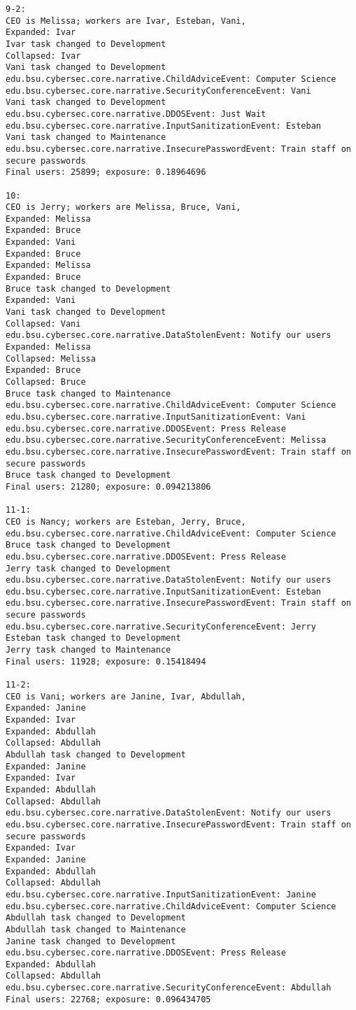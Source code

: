 \begin{verbatim}
9-2:
CEO is Melissa; workers are Ivar, Esteban, Vani, 
Expanded: Ivar
Ivar task changed to Development
Collapsed: Ivar
Vani task changed to Development
edu.bsu.cybersec.core.narrative.ChildAdviceEvent: Computer Science
edu.bsu.cybersec.core.narrative.SecurityConferenceEvent: Vani
Vani task changed to Development
edu.bsu.cybersec.core.narrative.DDOSEvent: Just Wait
edu.bsu.cybersec.core.narrative.InputSanitizationEvent: Esteban
Vani task changed to Maintenance
edu.bsu.cybersec.core.narrative.InsecurePasswordEvent: Train staff on secure passwords
Final users: 25899; exposure: 0.18964696

10:
CEO is Jerry; workers are Melissa, Bruce, Vani, 
Expanded: Melissa
Expanded: Bruce
Expanded: Vani
Expanded: Bruce
Expanded: Melissa
Expanded: Bruce
Bruce task changed to Development
Expanded: Vani
Vani task changed to Development
Collapsed: Vani
edu.bsu.cybersec.core.narrative.DataStolenEvent: Notify our users
Expanded: Melissa
Collapsed: Melissa
Expanded: Bruce
Collapsed: Bruce
Bruce task changed to Maintenance
edu.bsu.cybersec.core.narrative.ChildAdviceEvent: Computer Science
edu.bsu.cybersec.core.narrative.InputSanitizationEvent: Vani
edu.bsu.cybersec.core.narrative.DDOSEvent: Press Release
edu.bsu.cybersec.core.narrative.SecurityConferenceEvent: Melissa
edu.bsu.cybersec.core.narrative.InsecurePasswordEvent: Train staff on secure passwords
Bruce task changed to Development
Final users: 21280; exposure: 0.094213806

11-1:
CEO is Nancy; workers are Esteban, Jerry, Bruce, 
edu.bsu.cybersec.core.narrative.ChildAdviceEvent: Computer Science
Bruce task changed to Development
edu.bsu.cybersec.core.narrative.DDOSEvent: Press Release
Jerry task changed to Development
edu.bsu.cybersec.core.narrative.DataStolenEvent: Notify our users
edu.bsu.cybersec.core.narrative.InputSanitizationEvent: Esteban
edu.bsu.cybersec.core.narrative.InsecurePasswordEvent: Train staff on secure passwords
edu.bsu.cybersec.core.narrative.SecurityConferenceEvent: Jerry
Esteban task changed to Development
Jerry task changed to Maintenance
Final users: 11928; exposure: 0.15418494

11-2:
CEO is Vani; workers are Janine, Ivar, Abdullah, 
Expanded: Janine
Expanded: Ivar
Expanded: Abdullah
Collapsed: Abdullah
Abdullah task changed to Development
Expanded: Janine
Expanded: Ivar
Expanded: Abdullah
Collapsed: Abdullah
edu.bsu.cybersec.core.narrative.DataStolenEvent: Notify our users
edu.bsu.cybersec.core.narrative.InsecurePasswordEvent: Train staff on secure passwords
Expanded: Ivar
Expanded: Janine
Expanded: Abdullah
Collapsed: Abdullah
edu.bsu.cybersec.core.narrative.InputSanitizationEvent: Janine
edu.bsu.cybersec.core.narrative.ChildAdviceEvent: Computer Science
Abdullah task changed to Development
Abdullah task changed to Maintenance
Janine task changed to Development
edu.bsu.cybersec.core.narrative.DDOSEvent: Press Release
Expanded: Abdullah
Collapsed: Abdullah
edu.bsu.cybersec.core.narrative.SecurityConferenceEvent: Abdullah
Final users: 22768; exposure: 0.096434705


\end{verbatim}
